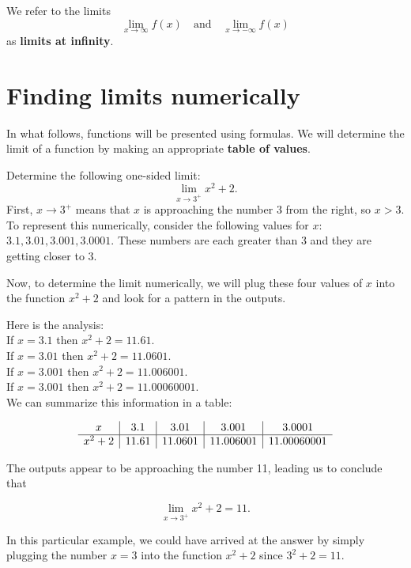 \documentclass[handout]{ximera}
\begin{document}
\begin{center}
\end{center}

We refer to the limits
\[\lim_{x \to \infty} f(x)  \quad \text{and} \quad \lim_{x \to -\infty} f(x) \]
as \textbf{limits at infinity}.


\section{Finding limits numerically}



In what follows, functions will be presented using formulas.  
We will determine the limit of a function by making an appropriate \textbf{table of values}.
 

\begin{example}[example 1]
Determine the following one-sided limit: 
\[\lim_{x \to 3^{+}} x^2 + 2.\]
First,  $x \to 3^{+}$ means that $x$ is approaching the number $3$ from the right, so $x > 3$. 
To represent this numerically, consider the following values for $x$: $3.1, 3.01, 3.001, 3.0001$.
These numbers are each greater than 3 and they are getting closer to 3.
 
Now, to determine the limit numerically,  we will plug these four values of $x$ into the function $x^2 + 2$ and  
look for a pattern in the outputs.

Here is the analysis:\\
If $x = 3.1$ then $x^2 + 2 = 11.61$.\\
If $x = 3.01$ then $x^2 + 2 = 11.0601$.\\
If $x = 3.001$ then $x^2 + 2 = 11.006001$.\\
If $x = 3.001$ then $x^2 + 2 = 11.00060001$.\\

We can summarize this information in a table:
  
\[
\begin{array}{ c | c | c | c | c }
  x & 3.1 & 3.01 & 3.001 & 3.0001 \\ 
	\hline
	x^2 + 2 & 11.61 & 11.0601 & 11.006001 & 11.00060001
\end{array}
\]


The outputs appear to be approaching the number 11, leading us to conclude that

\[\lim_{x \to 3^+} x^2 + 2 = 11.\] 
 
In this particular example, we could have arrived at the answer by simply plugging the number $x = 3$
into the function $x^2 + 2$ since $3^2 + 2 = 11$.  
\end{example}
\end{document}
